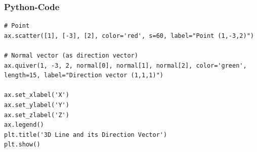 \documentclass{beamer}
\begin{document}
\begin{frame}[fragile]
\frametitle{Python-Code}
\begin{lstlisting}
# Point
ax.scatter([1], [-3], [2], color='red', s=60, label="Point (1,-3,2)")

# Normal vector (as direction vector)
ax.quiver(1, -3, 2, normal[0], normal[1], normal[2], color='green', length=15, label="Direction vector (1,1,1)")

ax.set_xlabel('X')
ax.set_ylabel('Y')
ax.set_zlabel('Z')
ax.legend()
plt.title('3D Line and its Direction Vector')
plt.show()
\end{lstlisting}
\end{frame}
\end{document}
